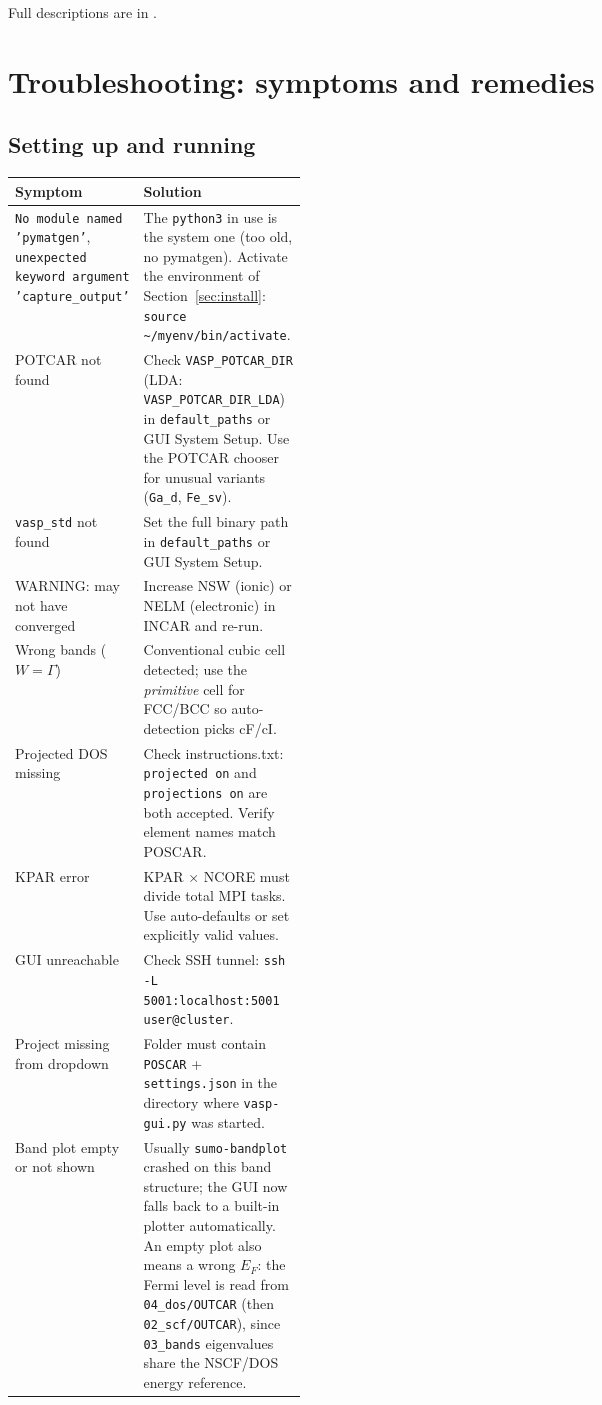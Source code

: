 \documentclass[11pt,a4paper]{scrartcl}
\newcommand{\thead}{\rowcolor{lightblue}}
\newcommand{\cmd}[1]{\texttt{\detokenize{#1}}}
\begin{document}
Full descriptions are in \cmd{ht_tools/README.md}.

\section{Troubleshooting: symptoms and remedies}
\label{sec:trouble}

\subsection{Setting up and running}

\begin{tabularx}{\linewidth}{@{}>{\raggedright\arraybackslash}p{0.34\linewidth}X@{}}
\thead
Symptom & Solution \\ \midrule
\texttt{No module named 'pymatgen'}, \texttt{unexpected keyword argument 'capture\_output'} &
  The \texttt{python3} in use is the system one (too old, no pymatgen).  Activate the
  environment of Section~\ref{sec:install}: \texttt{source \textasciitilde/myenv/bin/activate}. \\[3pt]
POTCAR not found &
  Check \texttt{VASP\_POTCAR\_DIR} (LDA: \texttt{VASP\_POTCAR\_DIR\_LDA}) in
  \texttt{default\_paths} or GUI System Setup.  Use the POTCAR chooser for unusual variants
  (\texttt{Ga\_d}, \texttt{Fe\_sv}). \\[3pt]
\texttt{vasp\_std} not found &
  Set the full binary path in \texttt{default\_paths} or GUI System Setup. \\[3pt]
WARNING: may not have converged &
  Increase NSW (ionic) or NELM (electronic) in INCAR and re-run. \\[3pt]
Wrong bands ($W = \Gamma$) &
  Conventional cubic cell detected; use the \textit{primitive} cell
  for FCC/BCC so auto-detection picks cF/cI. \\[3pt]
Projected DOS missing &
  Check instructions.txt: \texttt{projected on} and \texttt{projections on}
  are both accepted.  Verify element names match POSCAR. \\[3pt]
KPAR error &
  KPAR $\times$ NCORE must divide total MPI tasks.  Use auto-defaults or
  set explicitly valid values. \\[3pt]
GUI unreachable &
  Check SSH tunnel: \texttt{ssh -L 5001:localhost:5001 user@cluster}. \\[3pt]
Project missing from dropdown &
  Folder must contain \texttt{POSCAR} + \texttt{settings.json} in the
  directory where \texttt{vasp-gui.py} was started. \\[3pt]
Band plot empty or not shown &
  Usually \texttt{sumo-bandplot} crashed on this band structure; the GUI now
  falls back to a built-in plotter automatically.  An empty plot also means a
  wrong $E_F$: the Fermi level is read from \texttt{04\_dos/OUTCAR} (then
  \texttt{02\_scf/OUTCAR}), since \texttt{03\_bands} eigenvalues share the
  NSCF/DOS energy reference. \\
\bottomrule
\end{tabularx}
\end{document}

